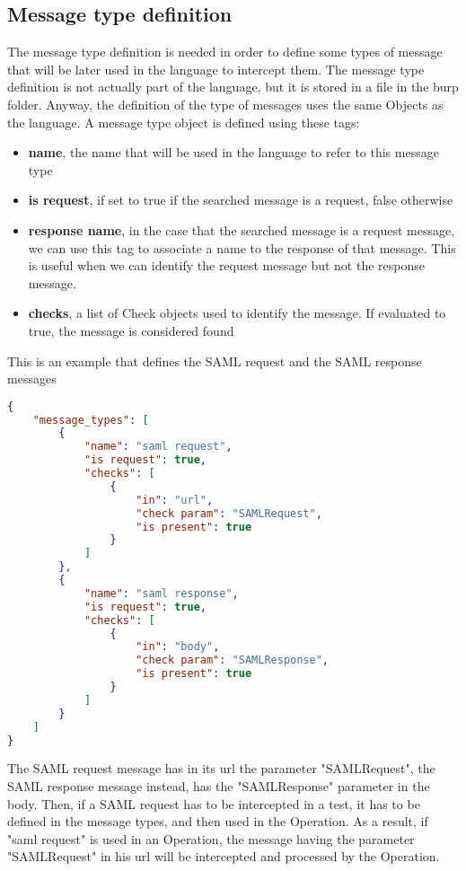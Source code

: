 \subsection{Message type definition}
The message type definition is needed in order to define some types of message that will be later used in the language to intercept them.
The message type definition is not actually part of the language, but it is stored in a file in the \Gls{burp} folder. Anyway, the definition of the type of messages uses the same Objects as the language.
A message type object is defined using these tags:
\begin{itemize}
    \item \textbf{name}, the name that will be used in the language to refer to this message type
    \item \textbf{is request}, if set to true if the searched message is a request, false otherwise
    \item \textbf{response name}, in the case that the searched message is a request message, we can use this tag to associate a name to the response of that message. This is useful when we can identify the request message but not the response message.
    \item \textbf{checks}, a list of Check objects used to identify the message. If evaluated to true, the message is considered found
\end{itemize}

This is an example that defines the \Gls{SAML} request and the \Gls{SAML} response messages
\begin{lstlisting}[language=json, caption=Message Types definition]
{
    "message_types": [
        {
            "name": "saml request",
            "is request": true,
            "checks": [
                {
                    "in": "url",
                    "check param": "SAMLRequest",
                    "is present": true
                }
            ]
        },
        {
            "name": "saml response",
            "is request": true,
            "checks": [
                {
                    "in": "body",
                    "check param": "SAMLResponse",
                    "is present": true
                }
            ]
        }
    ]
}
\end{lstlisting}
The \Gls{SAML} request message has in its url the parameter "SAMLRequest", the \Gls{SAML} response message instead, has the "SAMLResponse" parameter in the body. Then, if a \Gls{SAML} request has to be intercepted in a test, it has to be defined in the message types, and then used in the Operation.
As a result, if "saml request" is used in an Operation, the message having the parameter "SAMLRequest" in his url will be intercepted and processed by the Operation.


